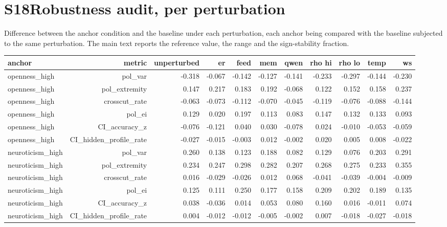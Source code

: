 \documentclass[11pt]{article}
\begin{document}
\section*{S18\quad Robustness audit, per perturbation}
Difference between the anchor condition and the baseline under each perturbation, each anchor being compared with the baseline subjected to the same perturbation. The main text reports the reference value, the range and the sign-stability fraction.
\begin{landscape}
\tiny
\setlength{\tabcolsep}{2.5pt}
\begin{longtable}{@{}lrrrrrrrrrr@{}}
\toprule
anchor & metric & unperturbed & er & feed & mem & qwen & rho hi & rho lo & temp & ws \\
\midrule
\endhead
openness\_high & pol\_var & -0.318 & -0.067 & -0.142 & -0.127 & -0.141 & -0.233 & -0.297 & -0.144 & -0.230 \\
openness\_high & pol\_extremity & 0.147 & 0.217 & 0.183 & 0.192 & -0.068 & 0.122 & 0.152 & 0.158 & 0.237 \\
openness\_high & crosscut\_rate & -0.063 & -0.073 & -0.112 & -0.070 & -0.045 & -0.119 & -0.076 & -0.088 & -0.144 \\
openness\_high & pol\_ei & 0.129 & 0.020 & 0.197 & 0.113 & 0.083 & 0.147 & 0.132 & 0.133 & 0.093 \\
openness\_high & CI\_accuracy\_z & -0.076 & -0.121 & 0.040 & 0.030 & -0.078 & 0.024 & -0.010 & -0.053 & -0.059 \\
openness\_high & CI\_hidden\_profile\_rate & -0.027 & -0.015 & -0.003 & 0.012 & -0.002 & 0.020 & 0.005 & 0.008 & -0.022 \\
neuroticism\_high & pol\_var & 0.260 & 0.138 & 0.123 & 0.188 & 0.082 & 0.129 & 0.076 & 0.203 & 0.291 \\
neuroticism\_high & pol\_extremity & 0.234 & 0.247 & 0.298 & 0.282 & 0.207 & 0.268 & 0.275 & 0.233 & 0.355 \\
neuroticism\_high & crosscut\_rate & 0.016 & -0.029 & -0.026 & 0.012 & 0.068 & -0.041 & -0.039 & -0.004 & -0.009 \\
neuroticism\_high & pol\_ei & 0.125 & 0.111 & 0.250 & 0.177 & 0.158 & 0.209 & 0.202 & 0.189 & 0.135 \\
neuroticism\_high & CI\_accuracy\_z & 0.038 & -0.036 & 0.014 & 0.053 & 0.080 & 0.160 & 0.016 & -0.011 & 0.074 \\
neuroticism\_high & CI\_hidden\_profile\_rate & 0.004 & -0.012 & -0.012 & -0.005 & -0.002 & 0.007 & -0.018 & -0.027 & -0.018 \\
\bottomrule
\end{longtable}
\normalsize
\end{landscape}
\end{document}
